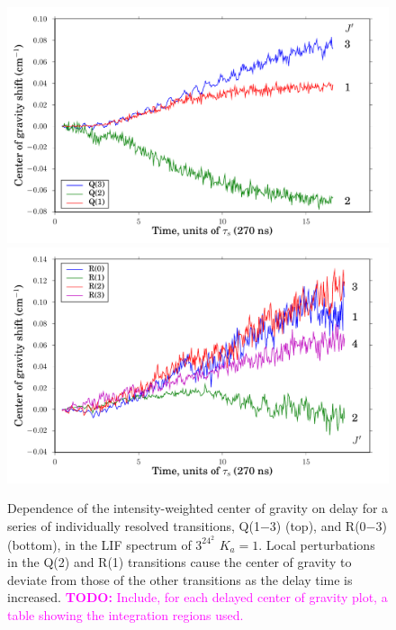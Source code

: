 \documentclass[12pt]{mitthesis}
\newcommand{\TODO} [1]{\textcolor{magenta}{\textbf{TODO:} #1}}
\newcommand{\Ka}[1]{$K_a\!\!=\!#1$}
\begin{document}
\begin{figure}
  \caption{Dependence of the intensity-weighted center of gravity on
    delay for a series of individually resolved transitions, Q(1$-$3)
    (top), and R(0$-$3) (bottom), in the LIF spectrum of $3^24^2$
    \Ka{1}.  Local perturbations in the Q(2) and R(1) transitions
    cause the center of gravity to deviate from those of the other
    transitions as the delay time is increased.  \TODO{Include, for
      each delayed center of gravity plot, a table showing the
      integration regions used.}}
  \label{fig:32b2-cog-delay}
  \centering
  \vspace{5mm}
  \includegraphics[width=6in]{32b2-q123-cog-delay.pdf}
  \includegraphics[width=6in]{32b2-r0123-cog-delay.pdf}
\end{figure}


\end{document}
